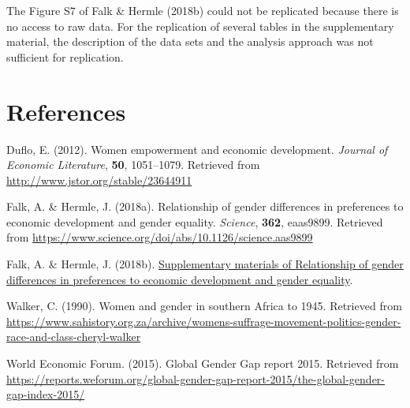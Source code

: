 \documentclass[
]{article}
\newlength{\cslhangindent}
\newlength{\cslentryspacingunit} %
\newenvironment{CSLReferences}[2] %
 {%
  \setlength{\parindent}{0pt}
  \ifodd #1
  \let\oldpar\par
  \def\par{\hangindent=\cslhangindent\oldpar}
  \fi
  \setlength{\parskip}{#2\cslentryspacingunit}
 }%
 {}
\begin{document}
The Figure S7 of Falk \& Hermle (2018b) could not be replicated because
there is no access to raw data. For the replication of several tables in
the supplementary material, the description of the data sets and the
analysis approach was not sufficient for replication.

\hypertarget{references}{%
\section*{References}\label{references}}

\hypertarget{refs}{}
\begin{CSLReferences}{1}{0}
\leavevmode{}%
Duflo, E. (2012). Women empowerment and economic development.
\emph{Journal of Economic Literature}, \textbf{50}, 1051--1079.
Retrieved from \url{http://www.jstor.org/stable/23644911}

\leavevmode{}%
Falk, A. \& Hermle, J. (2018a). Relationship of gender differences in
preferences to economic development and gender equality. \emph{Science},
\textbf{362}, eaas9899. Retrieved from
\url{https://www.science.org/doi/abs/10.1126/science.aas9899}

\leavevmode{}%
Falk, A. \& Hermle, J. (2018b).
\href{http://science.sciencemag.org/content/suppl/2018/10/17/362.6412.eaas9899.DC1}{Supplementary
materials of {R}elationship of gender differences in preferences to
economic development and gender equality}.

\leavevmode{}%
Walker, C. (1990). Women and gender in southern {A}frica to 1945.
Retrieved from
\url{https://www.sahistory.org.za/archive/womens-suffrage-movement-politics-gender-race-and-class-cheryl-walker}

\leavevmode{}%
World Economic Forum. (2015). {G}lobal {G}ender {G}ap report 2015.
Retrieved from
\url{https://reports.weforum.org/global-gender-gap-report-2015/the-global-gender-gap-index-2015/}

\end{CSLReferences}
\end{document}

